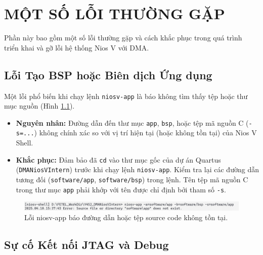 \appendix
\renewcommand{\thechapter}{B} %

\chapter{MỘT SỐ LỖI THƯỜNG GẶP}
\label{Appendix2}

Phần này bao gồm một số lỗi thường gặp và cách khắc phục trong quá trình triển khai và gỡ lỗi hệ thống Nios V với DMA.

\section{Lỗi Tạo BSP hoặc Biên dịch Ứng dụng}
\label{sec:trouble_bsp_app}

Một lỗi phổ biến khi chạy lệnh \texttt{niosv-app} là báo không tìm thấy tệp hoặc thư mục nguồn (Hình \ref{fig:03_67}).
\begin{itemize}
    \item \textbf{Nguyên nhân:} Đường dẫn đến thư mục \texttt{app}, \texttt{bsp}, hoặc tệp mã nguồn C (\texttt{-s=...}) không chính xác so với vị trí hiện tại (hoặc không tồn tại) của Nios V Shell. 
    \item \textbf{Khắc phục:} Đảm bảo đã \texttt{cd} vào thư mục gốc của dự án Quartus (\texttt{DMANiosVIntern}) trước khi chạy lệnh \texttt{niosv-app}. Kiểm tra lại các đường dẫn tương đối (\texttt{software/app}, \texttt{software/bsp}) trong lệnh. Tên tệp mã nguồn C trong thư mục \texttt{app} phải khớp với tên được chỉ định bởi tham số \texttt{-s}.
\end{itemize}

\begin{figure}[htbp]
    \centering
    \includegraphics[width=\linewidth]{Images/03_67_AppendixTroubleshootingBSPError.png}
    \caption{Lỗi niosv-app báo đường dẫn hoặc tệp source code không tồn tại.}
    \label{fig:03_67}
\end{figure}

\section{Sự cố Kết nối JTAG và Debug}
\label{sec:trouble_jtag}

